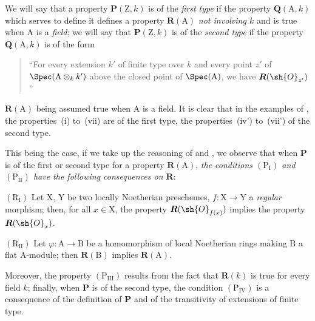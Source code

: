 \begin{env}[7.3.10]
\label{IV.7.3.10}
We will say that a property $\boldsymbol{P}(\mathrm{Z},k)$ is of the \emph{first type} if the property $\boldsymbol{Q}(\mathrm{A},k)$ which serves to define it defines a property $\boldsymbol{R}(\mathrm{A})$ \emph{not involving $k$} and is true when $\mathrm{A}$ is a \emph{field}; we will say that $\boldsymbol{P}(\mathrm{Z},k)$ is of the \emph{second type} if the property $\boldsymbol{Q}(\mathrm{A},k)$ is of the form
\begin{quote}
``For every extension $k'$ of finite type over $k$ and every point $z'$ of $\Spec(\mathrm{A}\otimes_k k')$ above the closed point of $\Spec(\mathrm{A})$, we have $\boldsymbol{R}(\sh{O}_{z'})$''
\end{quote}
$\boldsymbol{R}(\mathrm{A})$ being assumed true when $\mathrm{A}$ is a field.
It is clear that in the examples of , the properties~(i) to~(vii) are of the first type, the properties~(iv') to~(vii') of the second type.

This being the case, if we take up the reasoning of  and , we observe that when $\boldsymbol{P}$ is of the first or second type for a property $\boldsymbol{R}(\mathrm{A})$, \emph{the conditions $(\mathrm{P_I})$ and $(\mathrm{P_{II}})$ have the following consequences on $\boldsymbol{R}$}:

$(\mathrm{R_I})$ Let $\mathrm{X}$, $\mathrm{Y}$ be two locally Noetherian preschemes, $f:\mathrm{X}\to\mathrm{Y}$ a \emph{regular} morphism; then, for all $x\in\mathrm{X}$, the property $\boldsymbol{R}(\sh{O}_{f(x)})$ implies the property $\boldsymbol{R}(\sh{O}_x)$.

$(\mathrm{R_{II}})$ Let $\varphi:\mathrm{A}\to\mathrm{B}$ be a homomorphism of local Noetherian rings making $\mathrm{B}$ a flat $\mathrm{A}$-module; then $\boldsymbol{R}(\mathrm{B})$ implies $\boldsymbol{R}(\mathrm{A})$.

Moreover, the property $(\mathrm{P_{III}})$ results from the fact that $\boldsymbol{R}(k)$ is true for every field $k$; finally, when $\boldsymbol{P}$ is of the second type, the condition $(\mathrm{P_{IV}})$ is a consequence of the definition of $\boldsymbol{P}$ and of the transitivity of extensions of finite type.
\end{env}

